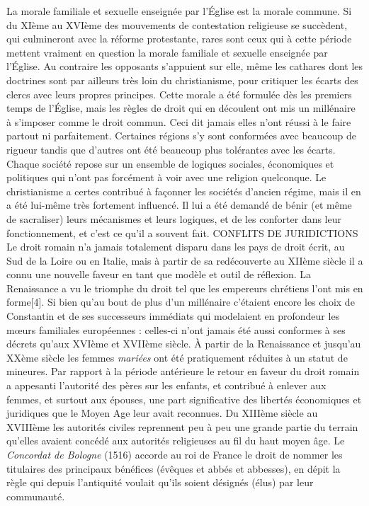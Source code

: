  La morale familiale et sexuelle enseignée par l'Église est la morale commune. Si du XIème au XVIème des mouvements de contestation religieuse se succèdent, qui culmineront avec la réforme protestante, rares sont ceux qui à cette période mettent vraiment en question la morale familiale et sexuelle enseignée par l'Église. Au contraire les opposants s'appuient sur elle, même les cathares dont les doctrines sont par ailleurs très loin du christianisme, pour critiquer les écarts des clercs avec leurs propres principes. Cette morale a été formulée dès les premiers temps de l'Église, mais les règles de droit qui en découlent ont mis un millénaire à s'imposer comme le droit commun. Ceci dit jamais elles n'ont réussi à le faire partout ni parfaitement. Certaines régions s'y sont conformées avec beaucoup de rigueur tandis que d'autres ont été beaucoup plus tolérantes avec les écarts. Chaque société repose sur un ensemble de logiques sociales, économiques et politiques qui n'ont pas forcément à voir avec une religion quelconque. Le christianisme a certes contribué à façonner les sociétés d'ancien régime, mais il en a été lui-même très fortement influencé. Il lui a été demandé de bénir (et même de sacraliser) leurs mécanismes et leurs logiques, et de les conforter dans leur fonctionnement, et c'est ce qu'il a souvent fait. 
CONFLITS DE JURIDICTIONS
 Le droit romain n'a jamais totalement disparu dans les pays de droit écrit, au Sud de la Loire ou en Italie, mais à partir de sa redécouverte au XIIème siècle il a connu une nouvelle faveur en tant que modèle et outil de réflexion. La Renaissance a vu le triomphe du droit tel que les empereurs chrétiens l'ont mis en forme[4]. Si bien qu'au bout de plus d'un millénaire c'étaient encore les choix de Constantin et de ses successeurs immédiats qui modelaient en profondeur les mœurs familiales européennes : celles-ci n'ont jamais été aussi conformes à ses décrets qu'aux XVIème et XVIIème siècle. À partir de la Renaissance et jusqu'au XXème siècle les femmes \emph{mariées} ont été pratiquement réduites à un statut de mineures. Par rapport à la période antérieure le retour en faveur du droit romain a appesanti l'autorité des pères sur les enfants, et contribué à enlever aux femmes, et surtout aux épouses, une part significative des libertés économiques et juridiques que le Moyen Age leur avait reconnues.
 Du XIIIème siècle au XVIIIème les autorités civiles reprennent peu à peu une grande partie du terrain qu'elles avaient concédé aux autorités religieuses au fil du haut moyen âge. Le \emph{Concordat de Bologne} (1516) accorde au roi de France le droit de nommer les titulaires des principaux bénéfices (évêques et abbés et abbesses), en dépit la règle qui depuis l'antiquité voulait qu'ils soient désignés (élus) par leur communauté. 
